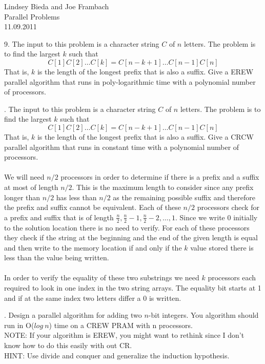 \documentclass[10pt]{article}
\begin{document}
	\begin{flushright}
	Lindsey Bieda and Joe Frambach\\
	Parallel Problems\\
	11.09.2011
	\end{flushright}

9. The input to this problem is a character string $C$ of $n$ letters. The problem is to find the largest $k$
such that
\[C[1]C[2] \ldots C[k] = C[n - k + 1] \ldots C[n - 1]C[n]\]
That is, $k$ is the length of the longest prefix that is also a suffix. Give a EREW parallel algorithm that
runs in poly-logarithmic time with a polynomial number of processors.

. The input to this problem is a character string $C$ of $n$ letters. The problem is to find the largest $k$
such that
\[C[1]C[2] \ldots C[k] = C[n - k + 1] \ldots C[n - 1]C[n]\]
That is, $k$ is the length of the longest prefix that is also a suffix. Give a CRCW parallel algorithm that
runs in constant time with a polynomial number of processors.\\
\\
We will need $n/2$ processors in order to determine if there is a prefix and a suffix at most of length $n/2$.
This is the maximum length to consider since any prefix longer than $n/2$ has less than $n/2$ as the remaining 
possible suffix and therefore the prefix and suffix cannot be equivalent. Each of these $n/2$ processors check
for a prefix and suffix that is of length $\frac{n}{2}, \frac{n}{2} - 1, \frac{n}{2} - 2, \ldots, 1$. Since we write
0 initially to the solution location there is no need to verify. For each of these processors they check if the string 
at the beginning and the end of the given length is equal and then write to the memory location if and only if the $k$
value stored there is less than the value being written.\\
\\
In order to verify the equality of these two substrings we need $k$ processors each required to look in one index in the two
string arrays. The equality bit starts at 1 and if at the same index two letters differ a 0 is written. 

. Design a parallel algorithm for adding two $n$-bit integers. You algorithm should run in O($log~n$) time
on a CREW PRAM with n processors.\\
NOTE: If your algorithm is EREW, you might want to rethink since I don't know how to do this easily
with out CR.\\
HINT: Use divide and conquer and generalize the induction hypothesis.
\end{document}
